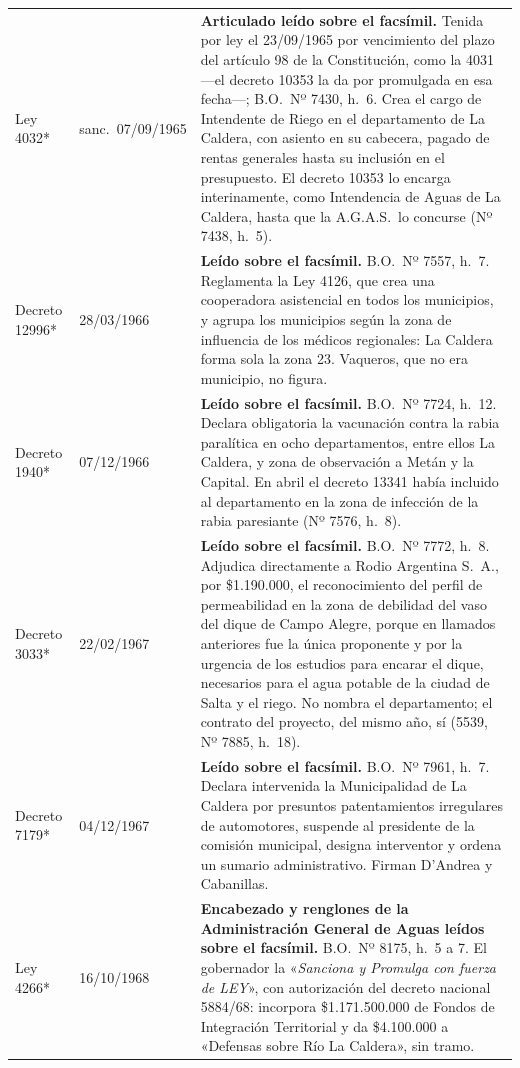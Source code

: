\begin{longtable}{@{}p{3.2cm}p{1.9cm}p{7.9cm}@{}}
Ley 4032* & sanc.\ 07/09/1965 & \textbf{Articulado leído sobre el facsímil.} Tenida por ley el 23/09/1965 por vencimiento del plazo del artículo 98 de la Constitución, como la 4031 ---el decreto 10353 la da por promulgada en esa fecha---; B.O.\ Nº 7430, h.\ 6. Crea el cargo de Intendente de Riego en el departamento de La Caldera, con asiento en su cabecera, pagado de rentas generales hasta su inclusión en el presupuesto. El decreto 10353 lo encarga interinamente, como Intendencia de Aguas de La Caldera, hasta que la A.G.A.S.\ lo concurse (Nº 7438, h.\ 5). \\
Decreto 12996* & 28/03/1966 & \textbf{Leído sobre el facsímil.} B.O.\ Nº 7557, h.\ 7. Reglamenta la Ley 4126, que crea una cooperadora asistencial en todos los municipios, y agrupa los municipios según la zona de influencia de los médicos regionales: La Caldera forma sola la zona 23. Vaqueros, que no era municipio, no figura. \\
Decreto 1940* & 07/12/1966 & \textbf{Leído sobre el facsímil.} B.O.\ Nº 7724, h.\ 12. Declara obligatoria la vacunación contra la rabia paralítica en ocho departamentos, entre ellos La Caldera, y zona de observación a Metán y la Capital. En abril el decreto 13341 había incluido al departamento en la zona de infección de la rabia paresiante (Nº 7576, h.\ 8). \\
Decreto 3033* & 22/02/1967 & \textbf{Leído sobre el facsímil.} B.O.\ Nº 7772, h.\ 8. Adjudica directamente a Rodio Argentina S.\ A., por \$1.190.000, el reconocimiento del perfil de permeabilidad en la zona de debilidad del vaso del dique de Campo Alegre, porque en llamados anteriores fue la única proponente y por la urgencia de los estudios para encarar el dique, necesarios para el agua potable de la ciudad de Salta y el riego. No nombra el departamento; el contrato del proyecto, del mismo año, sí (5539, Nº 7885, h.\ 18). \\
Decreto 7179* & 04/12/1967 & \textbf{Leído sobre el facsímil.} B.O.\ Nº 7961, h.\ 7. Declara intervenida la Municipalidad de La Caldera por presuntos patentamientos irregulares de automotores, suspende al presidente de la comisión municipal, designa interventor y ordena un sumario administrativo. Firman D'Andrea y Cabanillas. \\
Ley 4266* & 16/10/1968 & \textbf{Encabezado y renglones de la Administración General de Aguas leídos sobre el facsímil.} B.O.\ Nº 8175, h.\ 5 a 7. El gobernador la «\textit{Sanciona y Promulga con fuerza de LEY}», con autorización del decreto nacional 5884/68: incorpora \$1.171.500.000 de Fondos de Integración Territorial y da \$4.100.000 a «Defensas sobre Río La Caldera», sin tramo. \\

\end{longtable}
